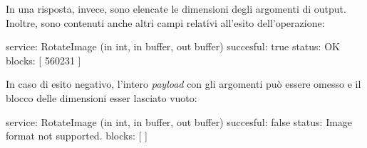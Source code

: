 \documentclass[a4paper,twoside]{article}
\begin{document}
In una risposta, invece, sono elencate le dimensioni degli argomenti di output. Inoltre, sono contenuti anche altri campi relativi all'esito dell'operazione:
\begin{yaml}
service: RotateImage (in int, in buffer, out buffer)
succesful: true
status: OK
blocks: [ 560231 ]
\end{yaml}
In caso di esito negativo, l'intero \emph{payload} con gli argomenti può essere omesso e il blocco delle dimensioni esser lasciato vuoto:
\begin{yaml}
service: RotateImage (in int, in buffer, out buffer)
succesful: false
status: Image format not supported.
blocks: [ ]
\end{yaml}
\end{document}
